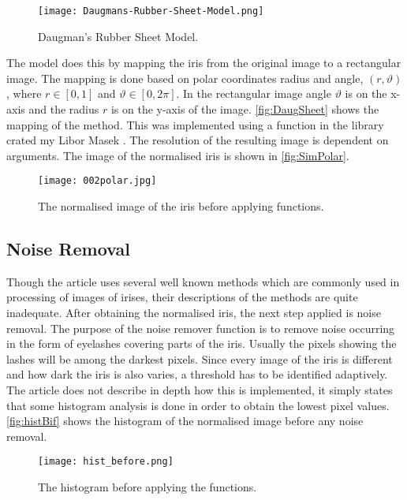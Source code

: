 \begin{figure}[h]
\centering
\texttt{[image: Daugmans-Rubber-Sheet-Model.png]}
\caption{Daugman's Rubber Sheet Model. \citep{Misztal2012}}
\label{fig:DaugSheet}
\end{figure}

The model does this by mapping the iris from the original image to a rectangular image. The mapping is done based on polar coordinates radius and angle, $(r,\vartheta)$, where $r\in[0,1]$ and $\vartheta\in[0,2\pi]$. In the rectangular image angle $\vartheta$ is on the x-axis and the radius $r$ is on the y-axis of the image. \autoref{fig:DaugSheet} shows the mapping of the method. This was implemented using a function in the library crated my Libor Masek \citep{LiborMasek2003}. The resolution of the resulting image is dependent on arguments. The image of the normalised iris is shown in \autoref{fig:SimPolar}. 

\begin{figure}[h]
\centering
\texttt{[image: 002polar.jpg]}
\caption{The normalised image of the iris before applying functions.}
\label{fig:SimPolar}
\end{figure}

\subsection{Noise Removal}
Though the article uses several well known methods which are commonly used in processing of images of irises, their descriptions of the methods are quite inadequate. After obtaining the normalised iris, the next step applied is noise removal. The purpose of the noise remover function is to remove noise occurring in the form of eyelashes covering parts of the iris. Usually the pixels showing the lashes will be among the darkest pixels. Since every image of the iris is different and how dark the iris is also varies, a threshold has to be identified adaptively. The article does not describe in depth how this is implemented, it simply states that some histogram analysis is done in order to obtain the lowest pixel values. \autoref{fig:histBif} shows the histogram of the normalised image before any noise removal. 

\begin{figure}[h]
	\centering
	\texttt{[image: hist\_before.png]}
	\caption{The histogram before applying the functions.}
	\label{fig:histBif}
\end{figure}

